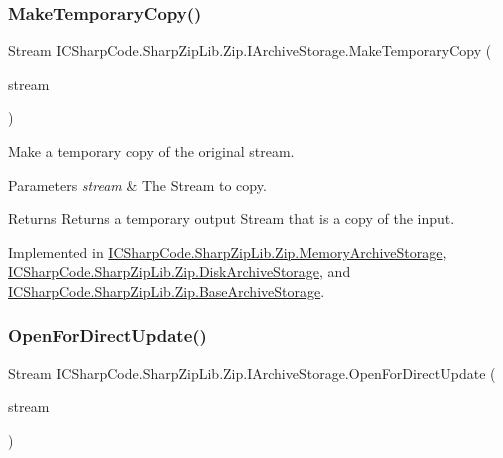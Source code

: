 \subsubsection{\texorpdfstring{Make\+Temporary\+Copy()}{MakeTemporaryCopy()}}
{\footnotesize\ttfamily Stream I\+C\+Sharp\+Code.\+Sharp\+Zip\+Lib.\+Zip.\+I\+Archive\+Storage.\+Make\+Temporary\+Copy (\begin{DoxyParamCaption}\item[{Stream}]{stream }\end{DoxyParamCaption})}



Make a temporary copy of the original stream. 


\begin{DoxyParams}{Parameters}
{\em stream} & The Stream to copy.\\
\hline
\end{DoxyParams}
\begin{DoxyReturn}{Returns}
Returns a temporary output Stream that is a copy of the input.
\end{DoxyReturn}


Implemented in \hyperlink{class_i_c_sharp_code_1_1_sharp_zip_lib_1_1_zip_1_1_memory_archive_storage_aba8d53a76aa47b36feefb4e42a98b4d3}{I\+C\+Sharp\+Code.\+Sharp\+Zip\+Lib.\+Zip.\+Memory\+Archive\+Storage}, \hyperlink{class_i_c_sharp_code_1_1_sharp_zip_lib_1_1_zip_1_1_disk_archive_storage_abe8267ae880501446aa0892c8f93a657}{I\+C\+Sharp\+Code.\+Sharp\+Zip\+Lib.\+Zip.\+Disk\+Archive\+Storage}, and \hyperlink{class_i_c_sharp_code_1_1_sharp_zip_lib_1_1_zip_1_1_base_archive_storage_a3580cacd0a0e6b3045bdeeaed72cb492}{I\+C\+Sharp\+Code.\+Sharp\+Zip\+Lib.\+Zip.\+Base\+Archive\+Storage}.

\mbox{\label{interface_i_c_sharp_code_1_1_sharp_zip_lib_1_1_zip_1_1_i_archive_storage_aa7e4da76c28cd9e88342bd910de38fba}} 
\subsubsection{\texorpdfstring{Open\+For\+Direct\+Update()}{OpenForDirectUpdate()}}
{\footnotesize\ttfamily Stream I\+C\+Sharp\+Code.\+Sharp\+Zip\+Lib.\+Zip.\+I\+Archive\+Storage.\+Open\+For\+Direct\+Update (\begin{DoxyParamCaption}\item[{Stream}]{stream }\end{DoxyParamCaption})}




